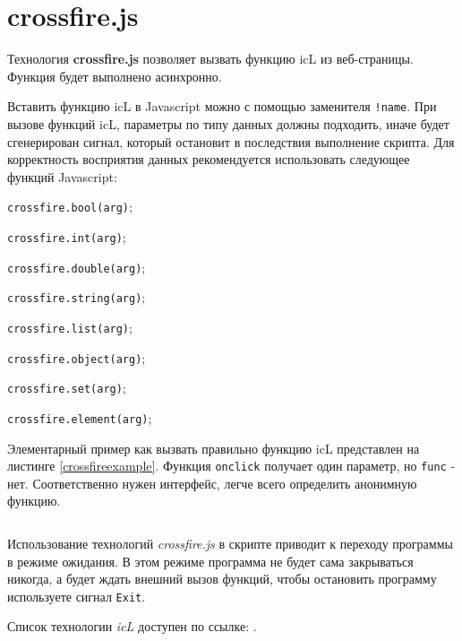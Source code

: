 \section{crossfire.js}

Технология {\bf crossfire.js} позволяет вызвать функцию icL из веб-страницы. Функция будет выполнено асинхронно.

Вставить функцию icL в Javascript можно с помощью заменителя \texttt{!{name}}. При вызове функций icL, параметры по типу данных должны подходить, иначе будет сгенерирован сигнал, который остановит в последствия выполнение скрипта. Для корректность восприятия данных рекомендуется использовать следующее функций Javascript:
\begin{icItems}
	\item \texttt{crossfire.bool(arg)};
	\item \texttt{crossfire.int(arg)};
	\item \texttt{crossfire.double(arg)};
	\item \texttt{crossfire.string(arg)};
	\item \texttt{crossfire.list(arg)};
	\item \texttt{crossfire.object(arg)};
	\item \texttt{crossfire.set(arg)};
	\item \texttt{crossfire.element(arg)};
\end{icItems}

Элементарный пример как вызвать правильно функцию icL представлен на листинге \ref{crossfireexample}. Функция \texttt{onclick} получает один параметр, но \texttt{func} - нет. Соответственно нужен интерфейс, легче всего определить анонимную функцию.

\begin{sourcecode}
	\label{crossfireexample}
    \inputminted[linenos]{icl}{../sources/crossfireexample.icL}
\end{sourcecode}

Использование технологий \textit{crossfire.js} в скрипте приводит к переходу программы в режиме ожидания. В этом режиме программа не будет сама закрываться никогда, а будет ждать внешний вызов функций, чтобы остановить программу используете сигнал \texttt{Exit}.

Список технологии \textit{icL} доступен по ссылке: .
